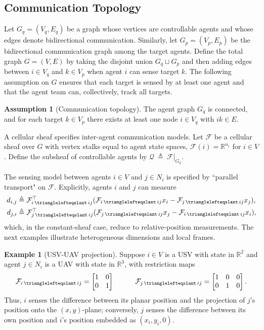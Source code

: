 \documentclass[letterpaper, 10 pt, conference]{ieeeconf}
\newcommand{\R}{\mathbb{R}}
\newcommand{\FF}{\mathcal{F}}
\DeclareMathOperator{\face}{\trianglelefteqslant}
\theoremstyle{definition}
\newtheorem{assumption}{Assumption}
\newtheorem{example}{Example}
\begin{document}
\subsection{Communication Topology}

Let $G_q=(V_q,E_q)$ be a graph whose vertices are controllable agents and whose edges denote bidirectional communication. Similarly, let $G_p=(V_p, E_p)$ be the bidirectional communication graph among the target agents. Define the total graph $G=(V,E)$ by taking the disjoint union $G_q\sqcup G_p$ and then adding edges between $i\in V_q$ and $k\in V_p$ when agent $i$ can sense target $k$. The following assumption on $G$ ensures that each target is sensed by at least one agent and that the agent team can, collectively, track all targets.

\begin{assumption}[Communication topology]
\label{Communication Topology}The agent graph $G_q$ is connected, and for each target $k\in V_p$ there exists at least one node $i\in V_q$ with $ik\in E$.
\end{assumption}

A cellular sheaf specifies inter-agent communication models. Let $\FF$ be a cellular sheaf over $G$ with vertex stalks equal to agent state spaces, $\FF(i) = \R^{n_i}$ for $i\in V$.
Define the subsheaf of controllable agents by $\mathcal{Q}~\triangleq~\FF|_{G_q}$.

The sensing model between agents $i\in V$ and $j\in N_i$ is specified by ``parallel transport" on $\FF$. Explicitly, agents $i$ and $j$ can measure
\[\begin{aligned}
d_{i,j}&\triangleq\FF_{i\face ij}^\top(\FF_{i\face ij}x_i - \FF_{j\face ij}x_j),\\ d_{j,i}&\triangleq\FF_{j\face ij}^\top(\FF_{j\face ij}x_j - \FF_{i\face ij}x_i),
\end{aligned}
\]
which, in the constant-sheaf case, reduce to relative-position measurements. The next examples illustrate heterogeneous dimensions and local frames.

\begin{example}[USV-UAV projection]\label{ex:projections}
    Suppose $i\in V$ is a USV with state in $\R^2$ and agent $j\in N_i$ is a UAV with state in $\R^3$, with restriction maps
    \[
    \FF_{i\face ij} = \begin{bmatrix}
        1 & 0 \\ 0 & 1
    \end{bmatrix}\quad\quad\quad\FF_{j\face ij} = \begin{bmatrix}
        1 & 0 & 0\\ 0 & 1 & 0
    \end{bmatrix}.
    \]
    Thus, $i$ senses the difference between its planar position and the projection of $j$'s position onto the $(x,y)$-plane; conversely, $j$ senses the difference between its own position and $i$'s position embedded as $(x_i , y_i, 0)$.
\end{example}
\end{document}
